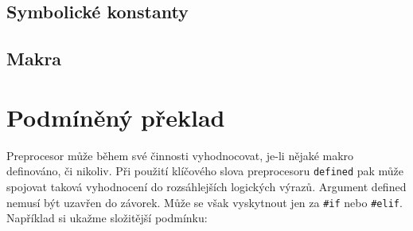    \subsection{Symbolické konstanty}
   \subsection{Makra}   
   
 \section{Podmíněný překlad}  
   Preprocesor může během své činnosti vyhodnocovat, je-li nějaké makro definováno, či nikoliv. Při použití klíčového slova preprocesoru \texttt{defined} pak může spojovat taková vyhodnocení do rozsáhlejších logických výrazů. Argument defined nemusí být uzavřen do závorek. Může se však vyskytnout jen za \lstinline[basicstyle=\ttfamily]!#if! nebo \lstinline[basicstyle=\ttfamily]!#elif!. Například si ukažme složitější podmínku: